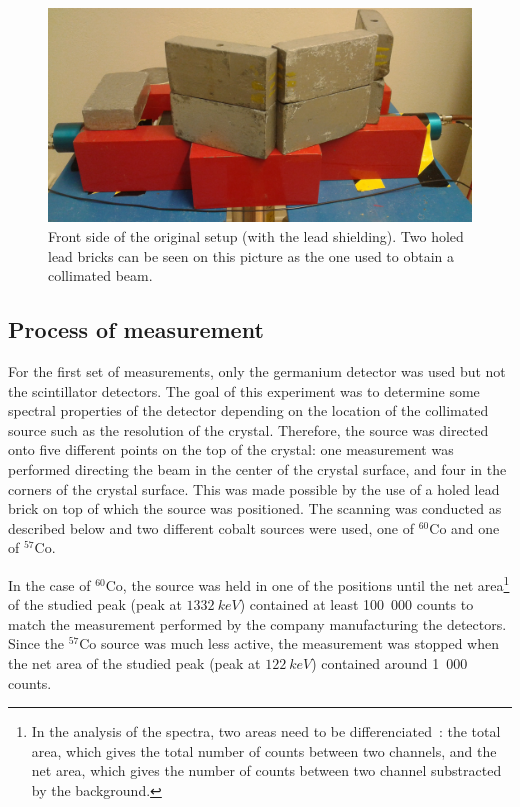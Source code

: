 \documentclass[11pt,a4paper]{article}
\begin{document}
\begin{figure}[!h]
\centering
\includegraphics[scale=0.15]{New_setup_front.jpg}
\caption{Front side of the original setup (with the lead shielding). Two holed lead bricks can be seen on this picture as the one used to obtain a collimated beam.}
\label{Setup_front}
\end{figure}

\subsection{Process of measurement} \label{protocol}

For the first set of measurements, only the germanium detector was used but not the scintillator detectors. The goal of this experiment was to determine some spectral properties of the detector depending on the location of the collimated source such as the resolution of the crystal. Therefore, the source was directed onto five different points on the top of the crystal: one measurement was performed directing the beam in the center of the crystal surface, and four in the corners of the crystal surface. This was made possible by the use of a holed lead brick on top of which the source was positioned. The scanning was conducted as described below and two different cobalt sources were used, one of $^{60}$Co and one of $^{57}$Co.

In the case of $^{60}$Co, the source was held in one of the positions until the net area\footnote{In the analysis of the spectra, two areas need to be differenciated~: the total area, which gives the total number of counts between two channels, and the net area, which gives the number of counts between two channel substracted by the background.} of the studied peak (peak at $1332~keV$) contained at least 100~000 counts to match the measurement performed by the company manufacturing the detectors. Since the $^{57}$Co source was much less active, the measurement was stopped when the net area of the studied peak (peak at $122~keV$) contained around 1~000 counts.
\end{document}
